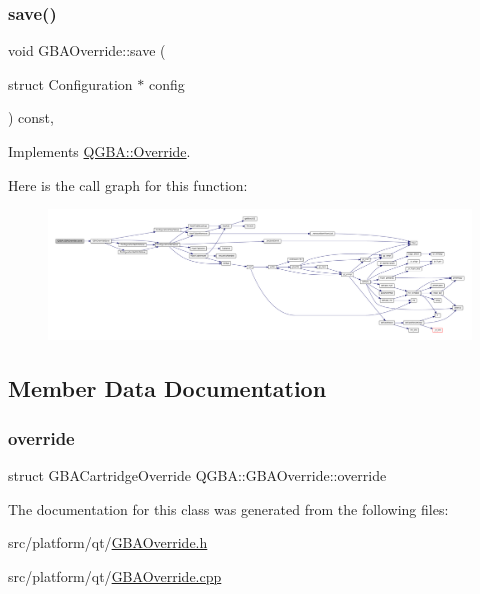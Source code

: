 \subsubsection{\texorpdfstring{save()}{save()}}
{\footnotesize\ttfamily void G\+B\+A\+Override\+::save (\begin{DoxyParamCaption}\item[{struct Configuration $\ast$}]{config }\end{DoxyParamCaption}) const\hspace{0.3cm}{\ttfamily [override]}, {\ttfamily [virtual]}}



Implements \mbox{\hyperlink{class_q_g_b_a_1_1_override_aa03c9614ec596b7e2fb15e59483fb99e}{Q\+G\+B\+A\+::\+Override}}.

Here is the call graph for this function\+:
\nopagebreak
\begin{figure}[H]
\begin{center}
\leavevmode
\includegraphics[width=350pt]{class_q_g_b_a_1_1_g_b_a_override_ac998ad9838873fb7beeeb3cd741856d0_cgraph}
\end{center}
\end{figure}


\subsection{Member Data Documentation}
\mbox{\label{class_q_g_b_a_1_1_g_b_a_override_a56be0cb915a2adf2cae835d34ea3c42e}} 
\subsubsection{\texorpdfstring{override}{override}}
{\footnotesize\ttfamily struct G\+B\+A\+Cartridge\+Override Q\+G\+B\+A\+::\+G\+B\+A\+Override\+::override}



The documentation for this class was generated from the following files\+:\begin{DoxyCompactItemize}
\item 
src/platform/qt/\mbox{\hyperlink{_g_b_a_override_8h}{G\+B\+A\+Override.\+h}}\item 
src/platform/qt/\mbox{\hyperlink{_g_b_a_override_8cpp}{G\+B\+A\+Override.\+cpp}}\end{DoxyCompactItemize}
